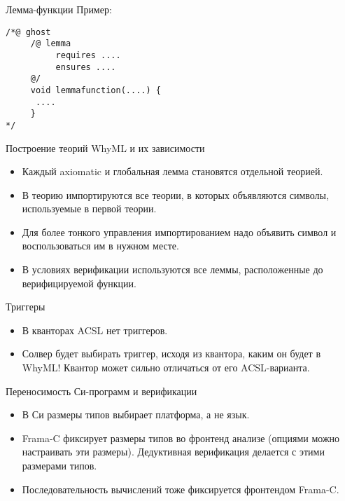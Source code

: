 \documentclass[hyperref={unicode=true}]{beamer}
\begin{document}
    \begin{frame}[fragile]{Лемма-функции}
    Пример:

    \begin{lstlisting}
/*@ ghost
     /@ lemma
          requires ....
          ensures ....
     @/
     void lemmafunction(....) {
      ....
     }
*/
    \end{lstlisting}
    \end{frame}

    \begin{frame}{Построение теорий WhyML и их зависимости}
    \begin{itemize}
    \item
    Каждый axiomatic и глобальная лемма становятся
    отдельной теорией.
    \item
    В теорию импортируются все теории, в которых
    объявляются символы, используемые в первой теории.
    \item
    Для более тонкого управления импортированием
    надо объявить символ и воспользоваться им в нужном месте.
    \item
    В условиях верификации используются все леммы,
    расположенные до верифицируемой функции.
    \end{itemize}
    \end{frame}

    \begin{frame}{Триггеры}
    \begin{itemize}
    \item
    В кванторах ACSL нет триггеров.
    \item
    Солвер будет выбирать триггер, исходя из квантора, каким
    он будет в WhyML! Квантор может сильно отличаться
    от его ACSL-варианта.
    \end{itemize}
    \end{frame}

    \begin{frame}{Переносимость Си-программ и верификации}
    \begin{itemize}
    \item
    В Си размеры типов выбирает платформа, а не язык.
    \item
    Frama-C фиксирует размеры типов во фронтенд анализе
    (опциями можно настраивать эти размеры). Дедуктивная
    верификация делается с этими размерами типов.
    \item
    Последовательность вычислений тоже фиксируется
    фронтендом Frama-C.
    \end{itemize}
    \end{frame}
\end{document}
